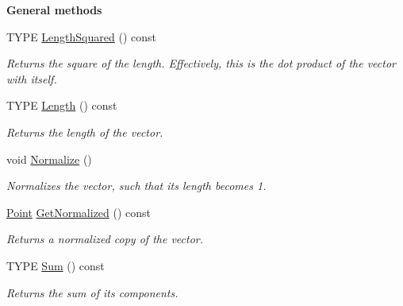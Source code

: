 \begin{Indent}\textbf{ General methods}\par
\begin{DoxyCompactItemize}
\item 
\mbox{\label{classcy_1_1_point_ae0a6ef0ee9bdf89def848e7137963e35}} 
T\+Y\+PE \mbox{\hyperlink{classcy_1_1_point_ae0a6ef0ee9bdf89def848e7137963e35}{Length\+Squared}} () const
\begin{DoxyCompactList}\small\item\em Returns the square of the length. Effectively, this is the dot product of the vector with itself. \end{DoxyCompactList}\item 
\mbox{\label{classcy_1_1_point_a84b15205b105373f7248e649df183bf0}} 
T\+Y\+PE \mbox{\hyperlink{classcy_1_1_point_a84b15205b105373f7248e649df183bf0}{Length}} () const
\begin{DoxyCompactList}\small\item\em Returns the length of the vector. \end{DoxyCompactList}\item 
\mbox{\label{classcy_1_1_point_ac1762ff49aaaa2195f9d84fa8be7acea}} 
void \mbox{\hyperlink{classcy_1_1_point_ac1762ff49aaaa2195f9d84fa8be7acea}{Normalize}} ()
\begin{DoxyCompactList}\small\item\em Normalizes the vector, such that its length becomes 1. \end{DoxyCompactList}\item 
\mbox{\label{classcy_1_1_point_abdf04ff4cdebd120502fc84aafd594fd}} 
\mbox{\hyperlink{classcy_1_1_point}{Point}} \mbox{\hyperlink{classcy_1_1_point_abdf04ff4cdebd120502fc84aafd594fd}{Get\+Normalized}} () const
\begin{DoxyCompactList}\small\item\em Returns a normalized copy of the vector. \end{DoxyCompactList}\item 
\mbox{\label{classcy_1_1_point_abd2a9a25d647e0aac626c54609801dde}} 
T\+Y\+PE \mbox{\hyperlink{classcy_1_1_point_abd2a9a25d647e0aac626c54609801dde}{Sum}} () const
\begin{DoxyCompactList}\small\item\em Returns the sum of its components. \end{DoxyCompactList}\item 

\end{DoxyCompactItemize}
\end{Indent}
